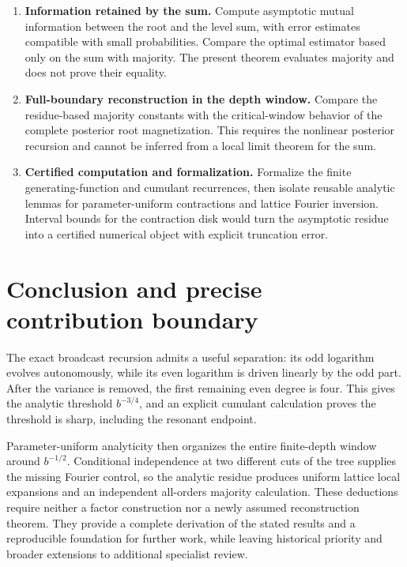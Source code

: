 \documentclass[11pt]{article}
\theoremstyle{definition}
\begin{document}
\begin{enumerate}[leftmargin=*,itemsep=6pt]
\item \textbf{Information retained by the sum.}
Compute asymptotic mutual information between the root and the level
sum, with error estimates compatible with small probabilities. Compare
the optimal estimator based only on the sum with majority. The
present theorem evaluates majority and does not prove their equality.

\item \textbf{Full-boundary reconstruction in the depth window.}
Compare the residue-based majority constants with the critical-window
behavior of the complete posterior root magnetization. This requires
the nonlinear posterior recursion and cannot be inferred from a local
limit theorem for the sum.

\item \textbf{Certified computation and formalization.}
Formalize the finite generating-function and cumulant recurrences,
then isolate reusable analytic lemmas for parameter-uniform
contractions and lattice Fourier inversion. Interval bounds for the
contraction disk would turn the asymptotic residue into a certified
numerical object with explicit truncation error.
\end{enumerate}

\section{Conclusion and precise contribution boundary}

The exact broadcast recursion admits a useful separation: its odd
logarithm evolves autonomously, while its even logarithm is driven
linearly by the odd part. After the variance is removed, the first
remaining even degree is four. This gives the analytic threshold
$b^{-3/4}$, and an explicit cumulant calculation proves the threshold
is sharp, including the resonant endpoint.

Parameter-uniform analyticity then organizes the entire finite-depth
window around $b^{-1/2}$. Conditional independence at two different
cuts of the tree supplies the missing Fourier control, so the
analytic residue produces uniform lattice local expansions and an
independent all-orders majority calculation. These deductions require
neither a factor construction nor a newly assumed reconstruction
theorem. They provide a complete derivation of the stated results and
a reproducible foundation for further work, while leaving historical
priority and broader extensions to additional specialist review.
\end{document}
